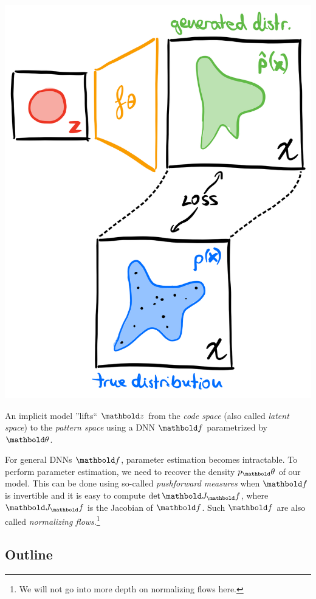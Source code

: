 \documentclass{tufte-handout}
\begin{document}
\begin{marginfigure}
    \includegraphics[width=\textwidth]{figures/implicit_model.png}
    \caption{An implicit model ''lifts`` $\vz$ from the \emph{code space} (also called \emph{latent space}) to the \emph{pattern space} using a DNN $\vf$ parametrized by $\vtheta$.}
\end{marginfigure}

For general DNNs $\vf$, parameter estimation becomes intractable. To perform parameter estimation, we need to recover the density $p_\vtheta$ of our model. This can be done using so-called \emph{pushforward measures} when $\vf$ is invertible and it is easy to compute $\det \mJ_\vf$, where $\mJ_\vf$ is the Jacobian of $\vf$. Such $\vf$ are also called \emph{normalizing flows}.\footnote{We will not go into more depth on normalizing flows here.}

\subsection{Outline}
\end{document}
